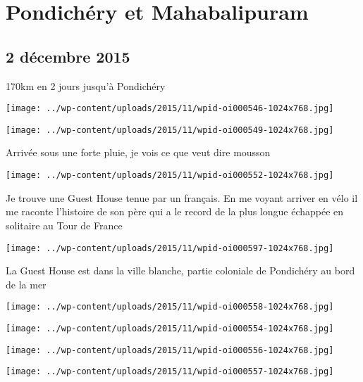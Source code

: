 \chapter{Pondichéry et Mahabalipuram}
\section*{2 décembre 2015}
170km en 2 jours jusqu'à Pondichéry \newline
 \newline
\centerline{\texttt{[image: ../wp-content/uploads/2015/11/wpid-oi000546-1024x768.jpg]} } 
 \newline
 \newline
\centerline{\texttt{[image: ../wp-content/uploads/2015/11/wpid-oi000549-1024x768.jpg]} } 
 \newline
 Arrivée sous une forte pluie, je vois ce que veut dire mousson \newline
 \newline
\centerline{\texttt{[image: ../wp-content/uploads/2015/11/wpid-oi000552-1024x768.jpg]} } 
 \newline
 Je trouve une Guest House tenue par un français. En me voyant arriver en vélo il me raconte l'histoire de son père qui a le record de la plus longue échappée en solitaire au Tour de France \newline
 \newline
\centerline{\texttt{[image: ../wp-content/uploads/2015/11/wpid-oi000597-1024x768.jpg]} } 
 \newline
 La Guest House est dans la ville blanche, partie coloniale de Pondichéry au bord de la mer \newline
 \newline
\centerline{\texttt{[image: ../wp-content/uploads/2015/11/wpid-oi000558-1024x768.jpg]} } 
 \newline
 \newline
\centerline{\texttt{[image: ../wp-content/uploads/2015/11/wpid-oi000554-1024x768.jpg]} } 
 \newline
 \newline
\centerline{\texttt{[image: ../wp-content/uploads/2015/11/wpid-oi000556-1024x768.jpg]} } 
 \newline
 \newline
\centerline{\texttt{[image: ../wp-content/uploads/2015/11/wpid-oi000557-1024x768.jpg]} } 
 \newline
